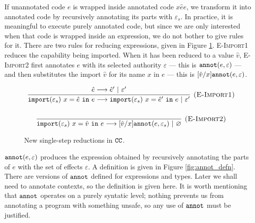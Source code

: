 If unannotated code $e$ is wrapped inside annotated code
${x}{\hat e}{e}$, we transform it into annotated
code by recursively annotating its parts with $\varepsilon_s$. In practice,
it is meaningful to execute purely annotated code, but since we are only
interested when that code is wrapped inside an  expression,
we do not bother to give rules for it. There are two rules for reducing
 expressions, given in Figure \ref{fig:epscalc_reductions}.
\textsc{E-Import1} reduces the capability being imported. When it has been
reduced to a value $\hat v$, \textsc{E-Import2} first annotates $e$ with its selected
authority $\varepsilon$ --- this is $\mathtt{annot}(e, \varepsilon)$ --- and then
substitutes the import $\hat v$ for its name $x$ in $e$ --- this is
$[\hat v/x]\mathtt{annot}(e, \varepsilon)$.

\begin{figure}


\[
\begin{array}{c}
\infer[\textsc{(E-Import1)}]
	{\kwa{import}(\varepsilon_s)~x = \hat e~\kw{in} e \longrightarrow \kwa{import}(\varepsilon_s)~x = \hat e'~\kw{in} e~|~\varepsilon'}
	{\hat e \longrightarrow \hat e'~|~\varepsilon'}\\[4ex]

\infer[\textsc{(E-Import2)}]
	{\kwa{import}(\varepsilon_s)~x = \hat v~\kw{in} e \longrightarrow [\hat v/x]\kwa{annot}(e, \varepsilon_s)~|~\varnothing}
	{}

\end{array}
\]
\caption{New single-step reductions in $\mathtt{CC}$.}
\label{fig:epscalc_reductions}
\end{figure}

$\mathtt{annot}(e, \varepsilon)$ produces the expression obtained by
recursively annotating the parts of $e$ with the set of effects
$\varepsilon$. A definition is given in Figure
\ref{fig:annot_defn}. There are versions of $\mathtt{annot}$ defined for
expressions and types. Later we shall need to annotate contexts, so
the definition is given here. It is worth mentioning that
$\mathtt{annot}$ operates on a purely syntatic level; nothing prevents
us from annotating a program with something unsafe, so any use of
$\mathtt{annot}$ must be justified.

